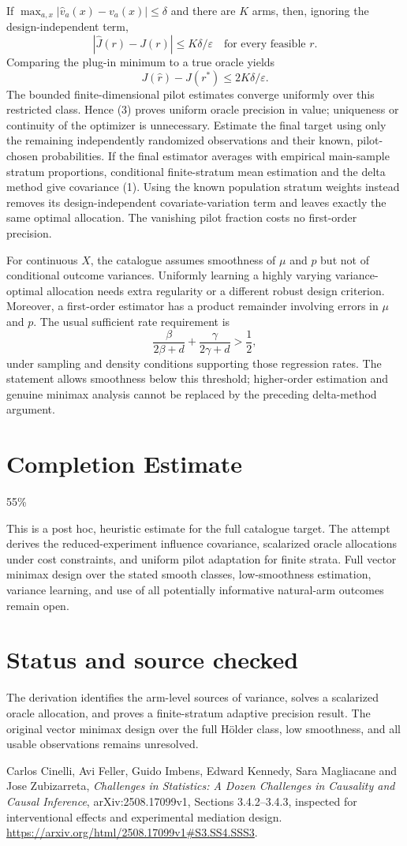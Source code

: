 \documentclass[11pt]{article}
\begin{document}
If $\max_{a,x}|\widehat v_a(x)-v_a(x)|\leq\delta$ and there are $K$ arms, then, ignoring the design-independent term,
\[
 |\widehat J(r)-J(r)|\leq K\delta/\varepsilon
 \quad\text{for every feasible }r.
\]
Comparing the plug-in minimum to a true oracle yields
\[
 J(\widehat r)-J(r^*)\leq2K\delta/\varepsilon. \tag{3}
\]
The bounded finite-dimensional pilot estimates converge uniformly over this restricted class. Hence (3) proves uniform oracle precision in value; uniqueness or continuity of the optimizer is unnecessary. Estimate the final target using only the remaining independently randomized observations and their known, pilot-chosen probabilities. If the final estimator averages with empirical main-sample stratum proportions, conditional finite-stratum mean estimation and the delta method give covariance (1). Using the known population stratum weights instead removes its design-independent covariate-variation term and leaves exactly the same optimal allocation. The vanishing pilot fraction costs no first-order precision.

For continuous $X$, the catalogue assumes smoothness of $\mu$ and $p$ but not of conditional outcome variances. Uniformly learning a highly varying variance-optimal allocation needs extra regularity or a different robust design criterion. Moreover, a first-order estimator has a product remainder involving errors in $\mu$ and $p$. The usual sufficient rate requirement is
\[
 \frac{\beta}{2\beta+d}+\frac{\gamma}{2\gamma+d}>\frac12,
\]
under sampling and density conditions supporting those regression rates. The statement allows smoothness below this threshold; higher-order estimation and genuine minimax analysis cannot be replaced by the preceding delta-method argument.

\section{Completion Estimate}
55\%

This is a post hoc, heuristic estimate for the full catalogue target.
The attempt derives the reduced-experiment influence covariance, scalarized oracle allocations under cost constraints, and uniform pilot adaptation for finite strata. Full vector minimax design over the stated smooth classes, low-smoothness estimation, variance learning, and use of all potentially informative natural-arm outcomes remain open.

\section*{Status and source checked}
The derivation identifies the arm-level sources of variance, solves a scalarized oracle allocation, and proves a finite-stratum adaptive precision result. The original vector minimax design over the full H\"older class, low smoothness, and all usable observations remains unresolved.

Carlos Cinelli, Avi Feller, Guido Imbens, Edward Kennedy, Sara Magliacane and Jose Zubizarreta, \emph{Challenges in Statistics: A Dozen Challenges in Causality and Causal Inference}, arXiv:2508.17099v1, Sections 3.4.2--3.4.3, inspected for interventional effects and experimental mediation design. \url{https://arxiv.org/html/2508.17099v1#S3.SS4.SSS3}.
\end{document}
